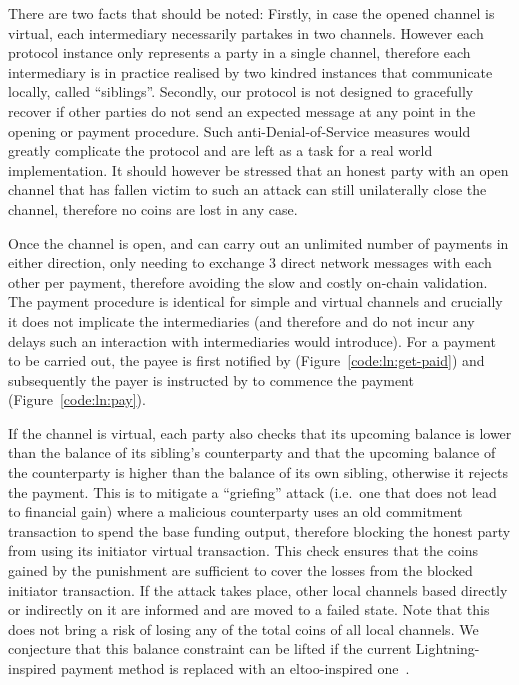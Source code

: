   There are two facts that should be noted: Firstly, in case the opened channel
  is virtual, each intermediary necessarily partakes in two channels.
  However each protocol instance only represents a party in a single channel,
  therefore each intermediary is in practice realised by two kindred
  \pchan instances that communicate locally, called ``siblings''. Secondly, our
  protocol is not designed to gracefully recover if other parties do not send an
  expected message at any point in the opening or payment procedure. Such
  anti-Denial-of-Service measures would greatly complicate the protocol and are
  left as a task for a real world implementation. It should however be stressed
  that an honest party with an open channel that has fallen victim to such an
  attack can still unilaterally close the channel, therefore no coins are lost
  in any case.

  Once the channel is open, \alice and \bob can carry out an unlimited number of
  payments in either direction, only needing to exchange $3$ direct network
  messages with each other per payment, therefore avoiding the slow and costly
  on-chain validation. The payment procedure is identical for simple and virtual
  channels and crucially it does not implicate the intermediaries (and therefore
  \alice and \bob do not incur any delays such an interaction with
  intermediaries would introduce). For a payment to be carried out, the payee is
  first notified by \environment (Figure~\ref{code:ln:get-paid}) and
  subsequently the payer is instructed by \environment to commence the payment
  (Figure~\ref{code:ln:pay}).

  If the channel is virtual, each party also checks that its upcoming balance is
  lower than the balance of its sibling's counterparty and that the upcoming
  balance of the counterparty is higher than the balance of its own sibling,
  otherwise it rejects the payment. This is to mitigate a ``griefing'' attack (i.e.\
  one that does not lead to financial gain) where a malicious counterparty
  uses an old commitment transaction to spend the base funding output, therefore
  blocking the honest party from using its initiator virtual transaction. This
  check ensures that the coins gained by the punishment are sufficient to cover
  the losses from the blocked initiator transaction. If the attack takes place,
  other local channels based directly or indirectly on it are informed and are
  moved to a failed state. Note that this does not bring a risk of losing any of
  the total coins of all local channels. We conjecture that this balance
  constraint can be lifted if the current Lightning-inspired payment method is
  replaced with an eltoo-inspired one~\cite{eltoo}.

